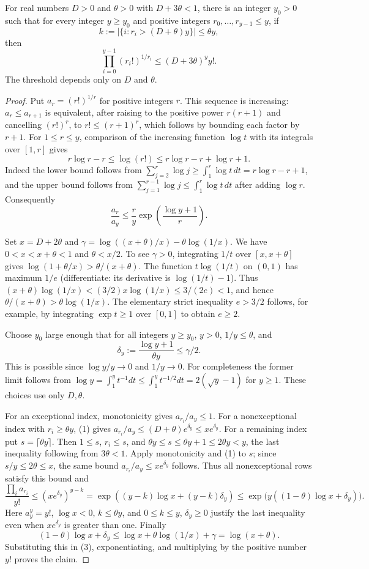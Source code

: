 \begin{lemma}
For real numbers $D>0$ and $\theta>0$ with $D+3\theta<1$, there is an
integer $y_0>0$ such that for every integer $y\ge y_0$ and positive
integers $r_0,\ldots,r_{y-1}\le y$, if
\[
 k:=|\{i:r_i>(D+\theta)y\}|\le\theta y,
\]
then
\[
 \prod_{i=0}^{y-1}(r_i!)^{1/r_i}\le(D+3\theta)^y y!.
\]
The threshold depends only on $D$ and $\theta$.
\end{lemma}
\begin{proof}
Put $a_r=(r!)^{1/r}$ for positive integers $r$.
This sequence is increasing: $a_r\le a_{r+1}$ is equivalent, after
raising to the positive power $r(r+1)$ and cancelling $(r!)^r$, to
$r!\le(r+1)^r$, which follows by bounding each factor by $r+1$.
For $1\le r\le y$, comparison of the increasing function $\log t$ with
its integrals over $[1,r]$ gives
\[
 r\log r-r\le\log(r!)\le r\log r-r+\log r+1.
\]
Indeed the lower bound follows from
$\sum_{j=2}^r\log j\ge\int_1^r\log t\,dt=r\log r-r+1$,
and the upper bound follows from
$\sum_{j=1}^{r-1}\log j\le\int_1^r\log t\,dt$ after adding $\log r$.
Consequently
\[
 \frac{a_r}{a_y}\le\frac r y
       \exp\left(\frac{\log y+1}{r}\right).                 \tag{1}
\]

Set $x=D+2\theta$ and
$\gamma=\log((x+\theta)/x)-\theta\log(1/x)$.
We have $0<x<x+\theta<1$ and $\theta<x/2$.
To see $\gamma>0$, integrating $1/t$ over $[x,x+\theta]$ gives
$\log(1+\theta/x)>\theta/(x+\theta)$.
The function $t\log(1/t)$ on $(0,1)$ has maximum $1/e$ (differentiate:
its derivative is $\log(1/t)-1$). Thus
$(x+\theta)\log(1/x)<(3/2)x\log(1/x)\le3/(2e)<1$,
and hence $\theta/(x+\theta)>\theta\log(1/x)$.
The elementary strict inequality $e>3/2$ follows, for example, by
integrating $\exp t\ge1$ over $[0,1]$ to obtain $e\ge2$.

Choose $y_0$ large enough that for all integers $y\ge y_0$,
$y>0$, $1/y\le\theta$, and
\[
 \delta_y:=\frac{\log y+1}{\theta y}\le\gamma/2.             \tag{2}
\]
This is possible since $\log y/y\to0$ and $1/y\to0$.
For completeness the former limit follows from
$\log y=\int_1^y t^{-1}dt\le\int_1^y t^{-1/2}dt
=2(\sqrt y-1)$ for $y\ge1$. These choices use only $D,\theta$.

For an exceptional index, monotonicity gives $a_{r_i}/a_y\le1$.
For a nonexceptional index with $r_i\ge\theta y$, (1) gives
$a_{r_i}/a_y\le(D+\theta)e^{\delta_y}\le xe^{\delta_y}$.
For a remaining index put $s=\lceil\theta y\rceil$.
Then $1\le s$, $r_i\le s$, and
$\theta y\le s\le\theta y+1\le2\theta y<y$,
the last inequality following from $3\theta<1$.
Apply monotonicity and (1) to $s$; since $s/y\le2\theta\le x$,
the same bound $a_{r_i}/a_y\le xe^{\delta_y}$ follows.
Thus all nonexceptional rows satisfy this bound and
\[
 \frac{\prod_i a_{r_i}}{y!}
 \le(xe^{\delta_y})^{y-k}
 =\exp((y-k)\log x+(y-k)\delta_y)
 \le\exp\bigl(y((1-\theta)\log x+\delta_y)\bigr).           \tag{3}
\]
Here $a_y^y=y!$, $\log x<0$, $k\le\theta y$, and
$0\le k\le y$, $\delta_y\ge0$ justify the last inequality even
when $xe^{\delta_y}$ is greater than one.
Finally
\[
 (1-\theta)\log x+\delta_y
 \le\log x+\theta\log(1/x)+\gamma
 =\log(x+\theta).
\]
Substituting this in (3), exponentiating, and multiplying by the
positive number $y!$ proves the claim.
\end{proof}

